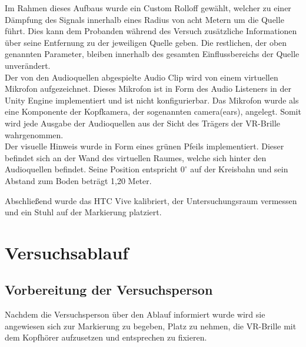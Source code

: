 Im Rahmen dieses Aufbaus wurde ein Custom Rolloff gewählt, welcher zu einer Dämpfung des Signals innerhalb eines Radius von acht Metern um die Quelle führt. Dies kann dem Probanden während des Versuch zusätzliche Informationen über seine Entfernung zu der jeweiligen Quelle geben. Die restlichen, der oben genannten Parameter, bleiben innerhalb des gesamten Einflussbereichs der Quelle unverändert.\\
Der von den Audioquellen abgespielte Audio Clip wird von einem virtuellen Mikrofon aufgezeichnet. Dieses Mikrofon ist in Form des Audio Listeners in der Unity Engine implementiert und ist nicht konfigurierbar. Das Mikrofon wurde als eine Komponente der Kopfkamera, der sogenannten camera(ears), angelegt. Somit wird jede Ausgabe der Audioquellen aus der Sicht des Trägers der VR-Brille wahrgenommen.\\
Der visuelle Hinweis wurde in Form eines grünen Pfeils implementiert. Dieser befindet sich an der Wand des virtuellen Raumes, welche sich hinter den Audioquellen befindet. Seine Position entspricht $0^{\circ}$ auf der Kreisbahn und sein Abstand zum Boden beträgt 1,20 Meter.

Abschließend wurde das HTC Vive kalibriert, der Untersuchungsraum vermessen und ein Stuhl auf der Markierung platziert.

\newpage

\section{Versuchsablauf}
\subsection{Vorbereitung der Versuchsperson}
Nachdem die Versuchsperson über den Ablauf informiert wurde wird sie angewiesen sich zur Markierung zu begeben, Platz zu nehmen, die VR-Brille mit dem Kopfhörer aufzusetzen und entsprechen zu fixieren.

